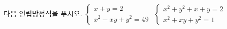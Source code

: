 다음 연립방정식을 푸시오.
 $\begin{cases} x+y=2 \\ x^2-xy+y^2=49 \end{cases}$
 $\begin{cases} x^2+y^2+x+y=2 \\ x^2+xy+y^2=1 \end{cases}$
